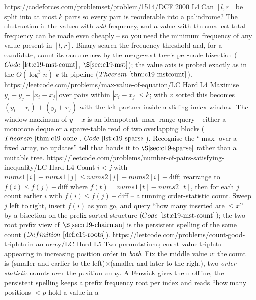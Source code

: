 \begin{mixedset}
    {https://codeforces.com/problemset/problem/1514/D}{CF 2000 L4}
    {Can \([l,r]\) be split into at most \(k\) parts so every part is reorderable into a
     palindrome? The obstruction is the values with \emph{odd} frequency, and a value with the
     smallest total frequency can be made even cheaply -- so you need the minimum frequency of
     any value present in \([l,r]\). Binary-search the frequency threshold and, for a candidate,
     count its occurrences by the merge-sort tree's per-node bisection
     (\(\coderef{c19-mst-count}\), \(\secref{c19-mst}\)); the value axis is probed exactly as in
     the \(O(\log^3 n)\) \(k\)-th pipeline (\(\thmref{c19-mstcount}\)).}
    {https://leetcode.com/problems/max-value-of-equation/}{LC Hard L4}
    {Maximise \(y_i+y_j+|x_i-x_j|\) over pairs within \(|x_i-x_j|\le k\); with \(x\) sorted this
     becomes \((y_i-x_i)+(y_j+x_j)\) with the left partner inside a sliding index window. The
     window maximum of \(y-x\) is an idempotent \(\max\) range query -- either a monotone deque
     or a sparse-table read of two overlapping blocks (\(\thmref{c19-oone}\),
     \(\coderef{c19-sparse}\)). Recognise the ``\(\max\) over a fixed array, no updates'' tell
     that hands it to \(\secref{c19-sparse}\) rather than a mutable tree.}
    {https://leetcode.com/problems/number-of-pairs-satisfying-inequality/}{LC Hard L4}
    {Count \(i<j\) with \(nums1[i]-nums1[j]\le nums2[j]-nums2[i]+\text{diff}\); rearrange to
     \(f(i)\le f(j)+\text{diff}\) where \(f(t)=nums1[t]-nums2[t]\), then for each \(j\) count
     earlier \(i\) with \(f(i)\le f(j)+\text{diff}\) -- a running order-statistic count. Sweep
     \(j\) left to right, insert \(f(i)\) as you go, and query ``how many inserted are \(\le x\)''
     by a bisection on the prefix-sorted structure (\(\coderef{c19-mst-count}\)); the
     two-root prefix view of \(\secref{c19-chairman}\) is the persistent spelling of the same
     count (\(\defref{c19-roots}\)).}
    {https://leetcode.com/problems/count-good-triplets-in-an-array/}{LC Hard L5}
    {Two permutations; count value-triplets appearing in increasing position order in
     \emph{both}. Fix the middle value \(v\): the count is (smaller-and-earlier to the
     left)\(\times\)(smaller-and-later to the right), two \emph{order-statistic} counts over the
     position array. A Fenwick gives them offline; the persistent spelling keeps a prefix
     frequency root per index and reads ``how many positions \(<p\) hold a value in a
}
\end{mixedset}
